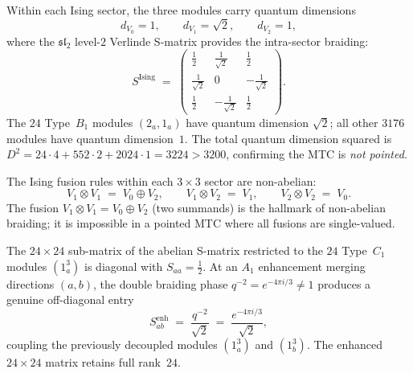 \begin{conjecture}[Non-abelian quantum dimensions at \texorpdfstring{$N = 3$}{N = 3}]
\label{conj:n3-nonabelian-qdims}
\ClaimStatusConjectured
Within each Ising sector, the three modules carry quantum dimensions
\[
 d_{V_0} = 1, \qquad d_{V_1} = \sqrt{2}, \qquad d_{V_2} = 1,
\]
where the $\mathfrak{sl}_2$ level-$2$ Verlinde S-matrix provides
the intra-sector braiding:
\begin{equation}\label{eq:ising-smatrix}
 S^{\mathrm{Ising}} \;=\;
 \begin{pmatrix}
 \frac{1}{2} & \frac{1}{\sqrt{2}} & \frac{1}{2} \\[4pt]
 \frac{1}{\sqrt{2}} & 0 & -\frac{1}{\sqrt{2}} \\[4pt]
 \frac{1}{2} & -\frac{1}{\sqrt{2}} & \frac{1}{2}
 \end{pmatrix}.
\end{equation}
The $24$ Type~$B_1$ modules $(2_a, 1_a)$ have quantum dimension
$\sqrt{2}$; all other $3176$ modules have quantum dimension~$1$.
The total quantum dimension squared is
$D^2 = 24 \cdot 4 + 552 \cdot 2 + 2024 \cdot 1 = 3224 > 3200$,
confirming the MTC is \emph{not pointed}.
\end{conjecture}

The Ising fusion rules within each $3 \times 3$ sector are
non-abelian:
\begin{equation}\label{eq:ising-fusion}
 V_1 \otimes V_1 \;=\; V_0 \oplus V_2,
 \qquad
 V_1 \otimes V_2 \;=\; V_1,
 \qquad
 V_2 \otimes V_2 \;=\; V_0.
\end{equation}
The fusion $V_1 \otimes V_1 = V_0 \oplus V_2$ (two summands)
is the hallmark of non-abelian braiding; it is impossible in a
pointed MTC where all fusions are single-valued.

\begin{conjecture}
\label{conj:n3-charge1-a1}
\ClaimStatusConjectured
The $24 \times 24$ sub-matrix of the abelian S-matrix restricted
to the $24$ Type~$C_1$ modules $(1_a^3)$ is diagonal with
$S_{aa} = \tfrac{1}{2}$.
At an $A_1$ enhancement merging directions $(a,b)$, the double
braiding phase $q^{-2} = e^{-4\pi i/3} \neq 1$ produces a
genuine off-diagonal entry
\[
 S^{\mathrm{enh}}_{ab}
 \;=\; \frac{q^{-2}}{\sqrt{2}}
 \;=\; \frac{e^{-4\pi i/3}}{\sqrt{2}},
\]
coupling the previously decoupled modules $(1_a^3)$ and $(1_b^3)$.
The enhanced $24 \times 24$ matrix retains full rank~$24$.
\end{conjecture}

